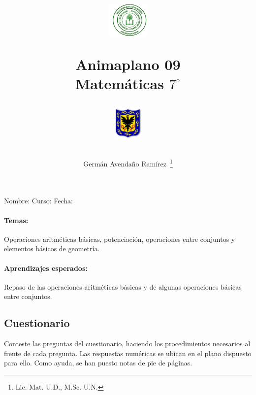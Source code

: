 \documentclass[10pt,twoside,letterpaper]{article}
\author{Germ\'an Avenda\~no Ram\'irez~\thanks{Lic. Mat. U.D., M.Sc. U.N.}}
\title{\begin{minipage}{.2\textwidth}
\includegraphics[height=1.75cm]{Images/logo-colegio.png}\end{minipage}
\begin{minipage}{.55\textwidth}
\begin{center}
Animaplano 09\\
Matemáticas $7^{\circ}$
\end{center}
\end{minipage}\hfill
\begin{minipage}{.2\textwidth}
\includegraphics[height=1.75cm]{Images/logo-sed.png} 
\end{minipage}}
\date{}
\begin{document}
\maketitle
Nombre: \hrulefill Curso: \underline{\hspace{1cm}}  Fecha: \underline{\hspace{2cm}}
\paragraph*{Temas:} Operaciones aritméticas básicas, potenciación, operaciones entre conjuntos y elementos básicos de geometría.
\paragraph*{Aprendizajes esperados:} Repaso de las operaciones aritméticas básicas y de algunas operaciones básicas entre conjuntos.
\subsection*{Cuestionario}
Conteste las preguntas del cuestionario, haciendo los procedimientos necesarios al frente de cada pregunta. Las respuestas numéricas se ubican en el plano dispuesto para ello. Como ayuda, se han puesto notas de pie de páginas.
\end{document}

